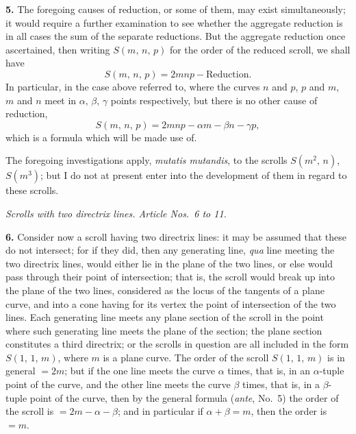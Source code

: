 \documentclass[11pt,a4paper]{article}
\begin{document}
\medskip

\textbf{5.} The foregoing causes of reduction, or some of them, may exist simultaneously; it would require a further examination to see whether the aggregate reduction is in all cases the sum of the separate reductions. But the aggregate reduction once ascertained, then writing $S(m,\,n,\,p)$ for the order of the reduced scroll, we shall have
\[
S(m,\,n,\,p) = 2mnp - \text{Reduction}.
\]
In particular, in the case above referred to, where the curves $n$ and $p$, $p$ and $m$, $m$ and $n$ meet in $\alpha,\,\beta,\,\gamma$ points respectively, but there is no other cause of reduction,
\[
S(m,\,n,\,p) = 2mnp - \alpha m - \beta n - \gamma p,
\]
which is a formula which will be made use of.

\medskip

The foregoing investigations apply, \textit{mutatis mutandis}, to the scrolls $S(m^2,\,n)$, $S(m^3)$; but I do not at present enter into the development of them in regard to these scrolls.

\bigskip

\begin{center}
\textit{Scrolls with two directrix lines. Article Nos.\ 6 to 11.}
\end{center}

\textbf{6.} Consider now a scroll having two directrix lines: it may be assumed that these do not intersect; for if they did, then any generating line, \textit{qua} line meeting the two directrix lines, would either lie in the plane of the two lines, or else would pass through their point of intersection; that is, the scroll would break up into the plane of the two lines, considered as the locus of the tangents of a plane curve, and into a cone having for its vertex the point of intersection of the two lines. Each generating line meets any plane section of the scroll in the point where such generating line meets the plane of the section; the plane section constitutes a third directrix; or the scrolls in question are all included in the form $S(1,\,1,\,m)$, where $m$ is a plane curve. The order of the scroll $S(1,\,1,\,m)$ is in general $= 2m$; but if the one line meets the curve $\alpha$ times, that is, in an $\alpha$-tuple point of the curve, and the other line meets the curve $\beta$ times, that is, in a $\beta$-tuple point of the curve, then by the general formula (\textit{ante}, No.~5) the order of the scroll is $= 2m - \alpha - \beta$; and in particular if $\alpha + \beta = m$, then the order is $= m$.

\medskip
\end{document}
